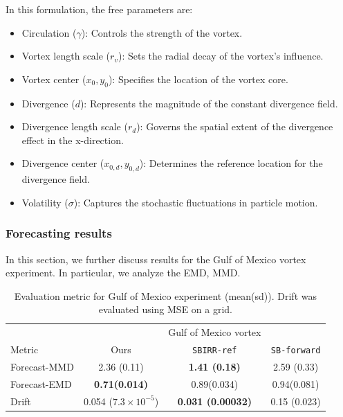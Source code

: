 In this formulation, the free parameters are:
\begin{itemize}
    \item Circulation ($\gamma$): Controls the strength of the vortex.
    \item Vortex length scale ($r_v$): Sets the radial decay of the vortex’s influence.
    \item Vortex center ($x_0, y_0$): Specifies the location of the vortex core.
    \item Divergence ($d$): Represents the magnitude of the constant divergence field.
    \item Divergence length scale ($r_d$): Governs the spatial extent of the divergence effect in the x-direction.
    \item Divergence center ($x_{0,d}, y_{0,d}$): Determines the reference location for the divergence field.
    \item Volatility ($\sigma$): Captures the stochastic fluctuations in particle motion.
\end{itemize}




\subsubsection{Forecasting results}
In this section, we further discuss results for the Gulf of Mexico vortex experiment. In particular, we analyze the EMD, MMD.

\begin{table}[!ht]
    \caption{Evaluation metric for Gulf of Mexico experiment (mean(sd)). Drift was evaluated using MSE on a grid.}
    \centering
    \begin{tabular}{lccc}
    \hline
    &     & Gulf of Mexico vortex & \\
    Metric     &  Ours & \texttt{SBIRR-ref} & \texttt{SB-forward} \\
    \hline
    Forecast-MMD & 2.36 (0.11) & \cellcolor{green!25}\textbf{1.41 (0.18)}& 2.59 (0.33) \\
    Forecast-EMD &  \cellcolor{green!25}\textbf{0.71(0.014)} & 0.89(0.034)& 0.94(0.081) \\
    Drift & 0.054 ($7.3\times 10^{-5}$) & \cellcolor{green!25}\textbf{0.031 (0.00032)} & 0.15 (0.023) \\
    \hline
    \end{tabular}

    \label{tab:GoM}
\end{table}

